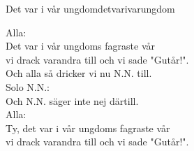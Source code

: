 \begin{song}{Det var i vår ungdom}{detvarivarungdom}
\begin{vers}
Alla:\\
Det var i vår ungdoms fagraste vår\\
vi drack varandra till och vi sade "Gutår!".\\
Och alla så dricker vi nu N.N. till.\\
Solo N.N.:\\
Och N.N. säger inte nej därtill.\\
Alla:\\
Ty, det var i vår ungdoms fagraste vår\\
vi drack varandra till och vi sade "Gutår!".\\
\end{vers}
\end{song}
